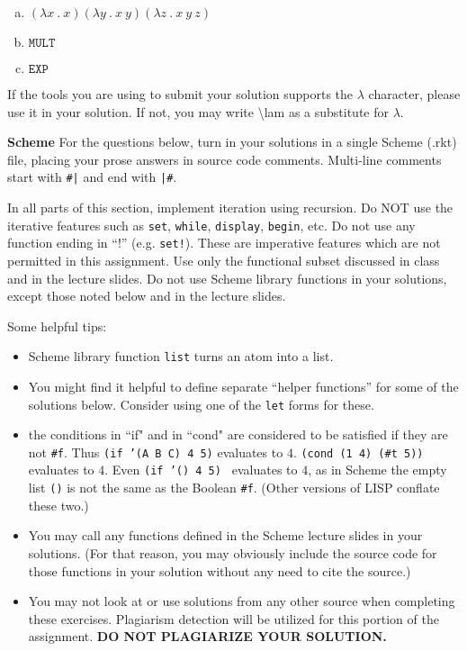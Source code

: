 \documentclass{exam}
\newcommand{\ID}[1]{\mathtt{#1}}
\newcommand{\numeral}[1]{\raisebox{0.65ex}{$\scriptscriptstyle\ulcorner$}{#1}\raisebox{0.65ex}{$\scriptscriptstyle\urcorner$}}
\begin{document}
\begin{questions}
\begin{enumerate}
\begin{enumerate}[a.]
\item $(\lambda x~ .~ x) (\lambda y~ .~ x ~y) (\lambda z~ .~ x~ y~ z)$

\item $\ID{MULT}$ \numeral{0} \numeral{3}

\item $\ID{EXP}$ \numeral{2} \numeral{1}

\end{enumerate}

\end{enumerate}


If the tools you are using to submit your solution supports the $\lambda$ character, please 
use it in your solution.  If not, you may write \textbackslash{}lam as a substitute for $\lambda$.




\newpage
\question[25] \textbf{Scheme}
For the questions below, turn in your solutions in a single Scheme (.rkt) file, placing your prose answers
 in source code comments.  Multi-line comments start with \verb!#|! and end with \verb!|#!.

 In all parts of this section, implement iteration using recursion. Do NOT use the iterative features such as {\tt set}, {\tt while}, {\tt display},
{\tt begin}, etc. Do not use any function ending in ``!'' (e.g. {\tt set!}).  These are imperative features which are not permitted in this assignment.
Use only the functional subset discussed in class and in the lecture slides.  Do not use 
Scheme library functions in your solutions, except those noted below and in the lecture slides.

Some helpful tips:
\begin{itemize}
\item Scheme library function {\tt list} turns an atom into a list.
\item You might find it helpful to define separate ``helper functions'' for some of the solutions below.  Consider
using one of the {\tt let} forms for these.
\item the conditions in ``if" and in ``cond" are considered to be satisfied if they are not {\tt \#f}.
 Thus {\tt (if '(A B C) 4 5)} evaluates to $4$. 
{\tt (cond (1 4) (\#t 5))} evaluates to $4$. 
Even {\tt (if '() 4 5) } evaluates to $4$, as in Scheme the empty list {\tt ()} is not the same as the Boolean {\tt \#f}. (Other versions of LISP conflate these two.) 
\item You may call any functions defined in the Scheme lecture slides in your solutions. (For that reason, you may obviously include the source
code for those functions in your solution without any need to cite the source.)
\item You may not look at or use solutions from any other source when completing 
these exercises. Plagiarism detection will be utilized for this portion of the assignment. {\bf DO NOT PLAGIARIZE YOUR SOLUTION.}
\end{itemize} 


\end{questions}
\end{document}
